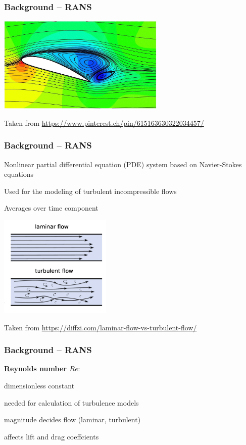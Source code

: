\begin{frame}
    \frametitle{Background -- RANS}
	\vspace*{8mm}
\includegraphics[width=0.6\textwidth, height=.55\textheight]{./Ressourcen/Praesentation/Bilder/streamlines.jpg}

Taken from \url{https://www.pinterest.ch/pin/615163630322034457/}
\end{frame}
\clearpage

\begin{frame}
    \frametitle{Background -- RANS}
	\vspace*{8mm}
\begin{multicols}{2}
Nonlinear partial differential equation (PDE) system \newline
based on Navier-Stokes equations

Used for the modeling of turbulent incompressible flows

Averages over time component

\vfill\columnbreak
\includegraphics[width=0.4\textwidth, height=.55\textheight]{./Ressourcen/Praesentation/Bilder/laminar_turbulent.png}

\end{multicols}
\vspace*{-4mm}
Taken from \url{https://diffzi.com/laminar-flow-vs-turbulent-flow/}
\end{frame}
\clearpage

\begin{frame}
    \frametitle{Background -- RANS}
	\vspace*{8mm}
	\textbf{Reynolds number $Re$}:

\begin{PraesentationAufzaehlung}
		\item dimensionless constant
		\item needed for calculation of turbulence models
		\item magnitude decides flow (laminar, turbulent)
		\item  affects lift and drag coeffcients
\end{PraesentationAufzaehlung}

\end{frame}
\clearpage

